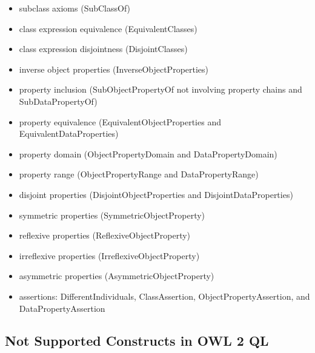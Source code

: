 \documentclass{llncs}
\begin{document}
\begin{itemize}
	\item subclass axioms (SubClassOf)
  \item class expression equivalence (EquivalentClasses)
  \item class expression disjointness (DisjointClasses)
  \item inverse object properties (InverseObjectProperties)
  \item property inclusion (SubObjectPropertyOf not involving property chains and SubDataPropertyOf)
  \item property equivalence (EquivalentObjectProperties and EquivalentDataProperties)
  \item property domain (ObjectPropertyDomain and DataPropertyDomain)
  \item property range (ObjectPropertyRange and DataPropertyRange)
  \item disjoint properties (DisjointObjectProperties and DisjointDataProperties)
  \item symmetric properties (SymmetricObjectProperty)
  \item reflexive properties (ReflexiveObjectProperty)
  \item irreflexive properties (IrreflexiveObjectProperty)
  \item asymmetric properties (AsymmetricObjectProperty)
  \item assertions: DifferentIndividuals, ClassAssertion, ObjectPropertyAssertion, and DataPropertyAssertion
\end{itemize}

\subsection{Not Supported Constructs in OWL 2 QL}
\end{document}
